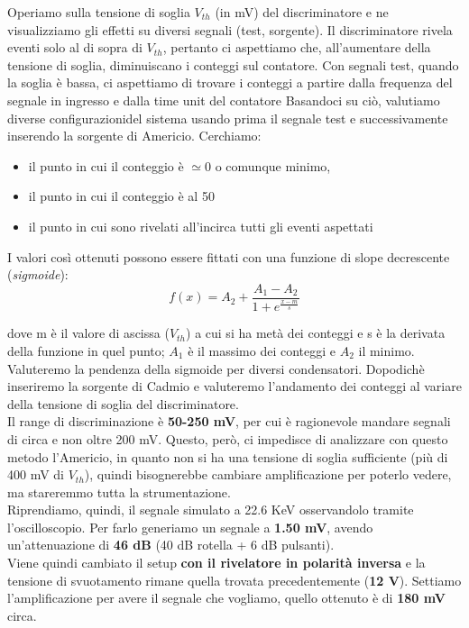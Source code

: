 \documentclass[a4paper]{article}
\begin{document}
Operiamo sulla tensione di soglia $V_{th}$ (in mV) del discriminatore e ne visualizziamo gli effetti su diversi segnali (test, sorgente). Il discriminatore rivela eventi solo al di sopra di $V_{th}$, pertanto ci aspettiamo che, all’aumentare della tensione di soglia, diminuiscano
i conteggi sul contatore. Con segnali test, quando la soglia è bassa, ci aspettiamo di trovare i conteggi a partire dalla frequenza del segnale in ingresso e dalla time unit del contatore Basandoci su ciò, valutiamo diverse configurazionidel sistema usando prima il segnale test e successivamente inserendo la sorgente di Americio.
Cerchiamo:
\begin{itemize}
\item il punto in cui il conteggio è $\simeq 0$ o comunque minimo,
\item il punto in cui il conteggio è al 50 %
\item il punto in cui sono rivelati all’incirca tutti gli eventi aspettati
\end{itemize}

I valori così ottenuti possono essere fittati con una funzione di slope decrescente (\emph{sigmoide}):
\begin{equation}
f(x)= A_{2} + \frac{A_{1}-A_{2}}{1+e^{\frac{x-m}{s}}}
\end{equation}

dove m è il valore di ascissa ($V_{th}$) a cui si ha metà dei conteggi e s è la derivata della funzione in quel punto; $A_{1}$ è il massimo dei conteggi e $A_{2}$ il minimo. Valuteremo la pendenza della sigmoide per diversi condensatori. Dopodichè inseriremo la sorgente di Cadmio e valuteremo l’andamento dei conteggi al variare della tensione di soglia del discriminatore.\\ 
Il range di discriminazione è \textbf{50-250 mV}, per cui è ragionevole mandare segnali di circa e non oltre 200 mV. Questo, però, ci impedisce di analizzare con questo metodo l'Americio, in quanto non si ha una tensione di soglia sufficiente (più di 400 mV di $V_{th}$), quindi bisognerebbe cambiare amplificazione per poterlo vedere, ma stareremmo tutta la strumentazione.\\
Riprendiamo, quindi, il segnale simulato a 22.6 KeV osservandolo tramite l'oscilloscopio. Per farlo generiamo un segnale a \textbf{1.50 mV}, avendo un'attenuazione di \textbf{46 dB} (40 dB rotella + 6 dB pulsanti).\\ 
Viene quindi cambiato il setup \textbf{con il rivelatore in polarità inversa} e la tensione di svuotamento rimane quella trovata precedentemente (\textbf{12 V}).
Settiamo l'amplificazione per avere il segnale che vogliamo, quello ottenuto è di \textbf{180 mV} circa. \\
\end{document}
